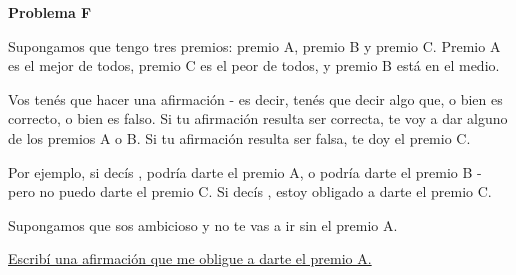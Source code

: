 \begin{center}
\Large \textbf{Problema F} \\
\end{center}

Supongamos que tengo tres premios: premio A, premio B y premio C.
Premio A es el mejor de todos, premio C es el peor de todos, y premio B está en el medio.

\bigskip

Vos tenés que hacer una afirmación - es decir, tenés que decir algo que, o bien es correcto, o bien es falso.
Si tu afirmación resulta ser correcta, te voy a dar alguno de los premios A o B. Si tu afirmación resulta ser falsa, te doy el premio C.

\bigskip


Por ejemplo, si decís , podría darte el premio A, o podría darte el premio B - pero no puedo darte el premio C.
Si decís , estoy obligado a darte el premio C.

\bigskip

Supongamos que sos ambicioso y no te vas a ir sin el premio A.

\bigskip

\underline{Escribí una afirmación que me obligue a darte el premio A.}

